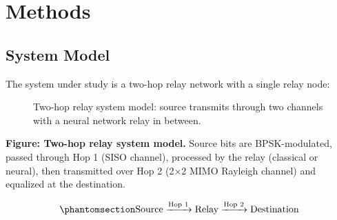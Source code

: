 \chapter{Methods}\label{sec:methods}

\section{System Model}\label{sec:system-model-1}

The system under study is a two-hop relay network with a single relay node:


\begin{figure}[H]
\centering
{}
\caption{Two-hop relay system model: source transmits through two channels
         with a neural network relay in between.}
\label{fig:relay-system-simple}
\end{figure}


\textbf{Figure: Two-hop relay system model.} Source bits are BPSK-modulated, passed through Hop 1 (SISO channel), processed by the relay (classical or neural), then transmitted over Hop 2 (2×2 MIMO Rayleigh channel) and equalized at the destination.

\begin{equation}\protect\phantomsection\label{eq:two-hop-system}{\text{Source} \xrightarrow{\text{Hop 1}} \text{Relay} \xrightarrow{\text{Hop 2}} \text{Destination}
}\end{equation}

